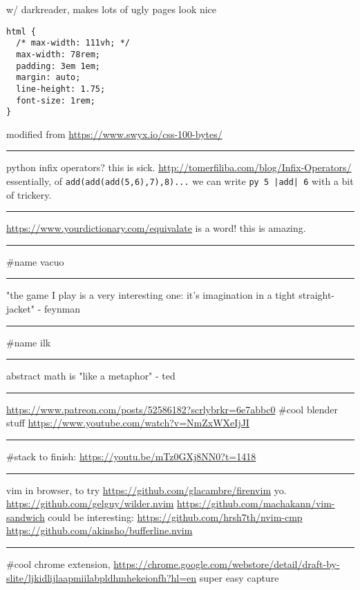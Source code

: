 \documentclass[letterpaper]{article}
\begin{document}
w/ darkreader, makes lots of ugly pages look nice

\begin{verbatim}
html {
  /* max-width: 111vh; */
  max-width: 78rem;
  padding: 3em 1em;
  margin: auto;
  line-height: 1.75;
  font-size: 1rem;
}
\end{verbatim}

modified from \url{https://www.swyx.io/css-100-bytes/}

\noindent\rule{\textwidth}{0.5pt}

python infix operators? this is sick.
\url{http://tomerfiliba.com/blog/Infix-Operators/} essentially, of
\texttt{add(add(add(5,6),7),8)...} we can write \texttt{py 5 |add| 6} with a bit of
trickery.

\noindent\rule{\textwidth}{0.5pt}

\url{https://www.yourdictionary.com/equivalate} is a word! this is amazing.

\noindent\rule{\textwidth}{0.5pt}

\#name vacuo

\noindent\rule{\textwidth}{0.5pt}

"the game I play is a very interesting one: it's imagination in a tight
straight-jacket" - feynman

\noindent\rule{\textwidth}{0.5pt}

\#name ilk

\noindent\rule{\textwidth}{0.5pt}

abstract math is "like a metaphor" - ted

\noindent\rule{\textwidth}{0.5pt}

\url{https://www.patreon.com/posts/52586182?scrlybrkr=6e7abbc0} \#cool blender
stuff \url{https://www.youtube.com/watch?v=NmZxWXeIjJI}

\noindent\rule{\textwidth}{0.5pt}

\#stack to finish: \url{https://youtu.be/mTz0GXj8NN0?t=1418}

\noindent\rule{\textwidth}{0.5pt}

vim in browser, to try \url{https://github.com/glacambre/firenvim} yo.
\url{https://github.com/gelguy/wilder.nvim}
\url{https://github.com/machakann/vim-sandwich} could be interesting:
\url{https://github.com/hrsh7th/nvim-cmp}
\url{https://github.com/akinsho/bufferline.nvim}

\noindent\rule{\textwidth}{0.5pt}

\#cool chrome extension,
\url{https://chrome.google.com/webstore/detail/draft-by-slite/ljkidlijlaapmiilabpldhmhekeionfh?hl=en}
super easy capture
\end{document}
